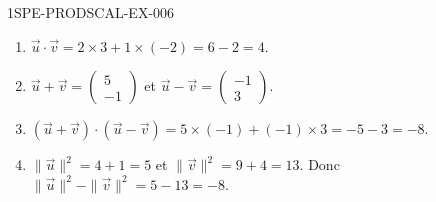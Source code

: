 \begin{corrige}{1SPE-PRODSCAL-EX-006}
\begin{enumerate}
\item $\vec{u} \cdot \vec{v} = 2 \times 3 + 1 \times (-2) = 6 - 2 = 4$.
\item $\vec{u} + \vec{v} = \begin{pmatrix} 5 \\ -1 \end{pmatrix}$ et $\vec{u} - \vec{v} = \begin{pmatrix} -1 \\ 3 \end{pmatrix}$.
\item $(\vec{u} + \vec{v}) \cdot (\vec{u} - \vec{v}) = 5 \times (-1) + (-1) \times 3 = -5 - 3 = -8$.
\item $\|\vec{u}\|^2 = 4 + 1 = 5$ et $\|\vec{v}\|^2 = 9 + 4 = 13$. Donc $\|\vec{u}\|^2 - \|\vec{v}\|^2 = 5 - 13 = -8$. \checkmark
\end{enumerate}
\end{corrige}
